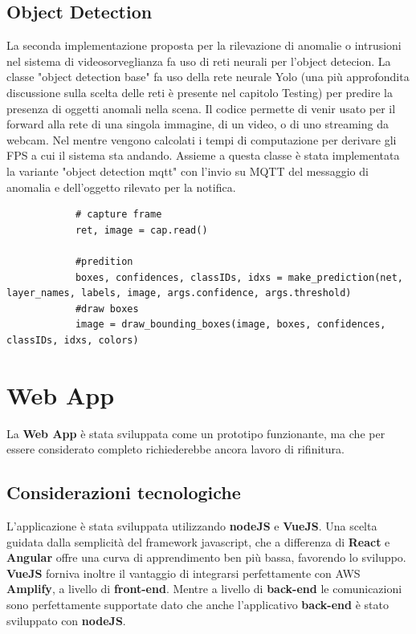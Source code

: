 \subsection{Object Detection}
La seconda implementazione proposta per la rilevazione di anomalie o intrusioni nel sistema di videosorveglianza fa uso di reti neurali per l'object detecion. 
La classe "object detection base" fa uso della rete neurale Yolo (una più approfondita discussione sulla scelta delle reti è presente nel capitolo Testing) per predire la presenza di oggetti anomali nella scena.
Il codice permette di venir usato per il forward alla rete di una singola immagine, di un video, o di uno streaming da webcam. Nel mentre vengono calcolati i tempi di computazione per derivare gli FPS a cui il sistema sta andando.
Assieme a questa classe è stata implementata la variante "object detection mqtt" con l'invio su MQTT del messaggio di anomalia e dell'oggetto rilevato per la notifica.

    \begin{lstlisting}
            # capture frame
            ret, image = cap.read()

            #predition
            boxes, confidences, classIDs, idxs = make_prediction(net, layer_names, labels, image, args.confidence, args.threshold)
            #draw boxes
            image = draw_bounding_boxes(image, boxes, confidences, classIDs, idxs, colors)
    \end{lstlisting}


\section{Web App}

    La \textbf{Web App} è stata sviluppata come un prototipo funzionante, ma che per essere considerato completo richiederebbe ancora lavoro di rifinitura.
    
    \subsection{Considerazioni tecnologiche}
    
        L'applicazione è stata sviluppata utilizzando \textbf{nodeJS} e \textbf{VueJS}. 
        Una scelta guidata dalla semplicità del framework javascript, che a differenza di \textbf{React} e \textbf{Angular} offre una curva di apprendimento ben più bassa, favorendo lo sviluppo. 
        \textbf{VueJS} forniva inoltre il vantaggio di integrarsi perfettamente con AWS \textbf{Amplify}, a livello di \textbf{front-end}.
        Mentre a livello di \textbf{back-end} le comunicazioni sono perfettamente supportate dato che anche l'applicativo \textbf{back-end} è stato sviluppato con \textbf{nodeJS}.
        
